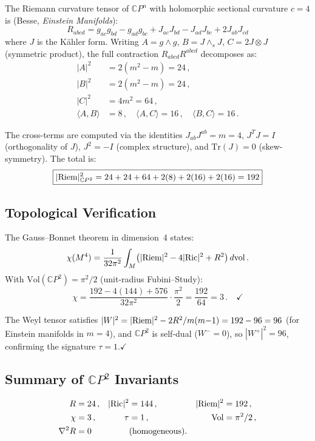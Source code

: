 \documentclass[12pt,a4paper]{article}
\theoremstyle{definition}
\begin{document}
The Riemann curvature tensor of $\mathbb{C}P^n$ with holomorphic
sectional curvature $c = 4$ is (Besse, \emph{Einstein Manifolds}):
\begin{equation}\label{eq:Riem-CP2}
R_{abcd} = g_{ac}g_{bd} - g_{ad}g_{bc} + J_{ac}J_{bd} - J_{ad}J_{bc} + 2J_{ab}J_{cd}
\end{equation}
where $J$ is the K\"ahler form.  Writing $A = g \wedge g$, $B = J \wedge_s J$,
$C = 2J \otimes J$ (symmetric product), the full contraction
$R_{abcd}R^{abcd}$ decomposes as:
\begin{align}
|A|^2 &= 2(m^2 - m) = 24\,, \\
|B|^2 &= 2(m^2 - m) = 24\,, \\
|C|^2 &= 4m^2 = 64\,, \\
\langle A, B \rangle &= 8\,,\quad
\langle A, C \rangle = 16\,,\quad
\langle B, C \rangle = 16\,.
\end{align}

The cross-terms are computed via the identities $J_{ab}J^{ab} = m = 4$,
$J^T J = I$ (orthogonality of $J$), $J^2 = -I$ (complex structure), and
$\mathrm{Tr}(J) = 0$ (skew-symmetry).  The total is:
\begin{equation}
\boxed{|{\rm Riem}|^2_{\mathbb{C}P^2}
= 24 + 24 + 64 + 2(8) + 2(16) + 2(16) = 192}
\end{equation}

\subsection{Topological Verification}

The Gauss--Bonnet theorem in dimension~4 states:
\[
\chi(M^4) = \frac{1}{32\pi^2}\int_M
\bigl(|{\rm Riem}|^2 - 4|{\rm Ric}|^2 + R^2\bigr)\,d\mathrm{vol}\,.
\]
With $\mathrm{Vol}(\mathbb{C}P^2) = \pi^2/2$ (unit-radius Fubini--Study):
\[
\chi = \frac{192 - 4(144) + 576}{32\pi^2}\cdot\frac{\pi^2}{2}
= \frac{192}{64} = 3\,.
\quad\checkmark
\]

The Weyl tensor satisfies $|W|^2 = |{\rm Riem}|^2 - 2R^2/m(m{-}1) = 192 - 96 = 96$
(for Einstein manifolds in $m = 4$), and $\mathbb{C}P^2$ is self-dual
($W^- = 0$), so $|W^+|^2 = 96$, confirming the signature
$\tau = 1$.\quad$\checkmark$

\subsection{Summary of $\mathbb{C}P^2$ Invariants}

\begin{equation}
\begin{aligned}
R &= 24\,, & |{\rm Ric}|^2 &= 144\,, & |{\rm Riem}|^2 &= 192\,, \\
\chi &= 3\,, & \tau &= 1\,, & \mathrm{Vol} &= \pi^2/2\,, \\
\nabla^2 R &= 0 & &\text{(homogeneous).} & &
\end{aligned}
\end{equation}
\end{document}
